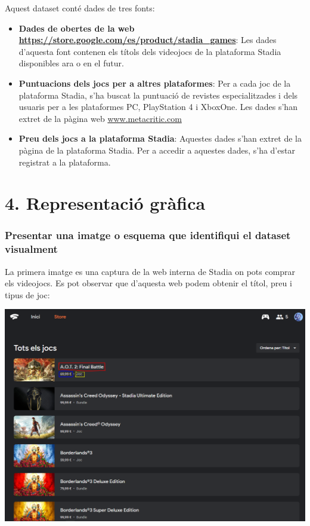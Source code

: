 \documentclass[]{article}
\begin{document}
Aquest dataset conté dades de tres fonts:

\begin{itemize}
\item
  \textbf{Dades de obertes de la web
  \url{https://store.google.com/es/product/stadia_games}}: Les dades
  d'aquesta font contenen els títols dels videojocs de la plataforma
  Stadia disponibles ara o en el futur.
\item
  \textbf{Puntuacions dels jocs per a altres plataformes}: Per a cada
  joc de la plataforma Stadia, s'ha buscat la puntuació de revistes
  especialitzades i dels usuaris per a les plataformes PC, PlayStation 4
  i XboxOne. Les dades s'han extret de la pàgina web
  \url{www.metacritic.com}
\item
  \textbf{Preu dels jocs a la plataforma Stadia}: Aquestes dades s'han
  extret de la pàgina de la plataforma Stadia. Per a accedir a aquestes
  dades, s'ha d'estar registrat a la plataforma.
\end{itemize}

\hypertarget{representaciuxf3-gruxe0fica}{%
\section{4. Representació gràfica}\label{representaciuxf3-gruxe0fica}}

\hypertarget{presentar-una-imatge-o-esquema-que-identifiqui-el-dataset-visualment}{%
\subsubsection{Presentar una imatge o esquema que identifiqui el dataset
visualment}\label{presentar-una-imatge-o-esquema-que-identifiqui-el-dataset-visualment}}

La primera imatge es una captura de la web interna de Stadia on pots
comprar els videojocs. Es pot observar que d'aquesta web podem obtenir
el títol, preu i tipus de joc:

\includegraphics{stadia_store_list.png}
\end{document}
